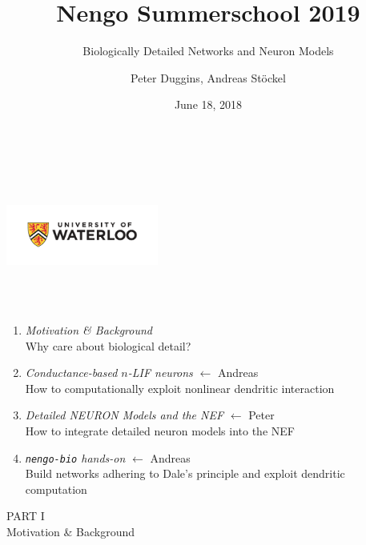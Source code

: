 \documentclass[aspectratio=169]{beamer}
\title{Nengo Summerschool 2019}
\subtitle{Biologically Detailed Networks and Neuron Models}
\author{Peter Duggins, Andreas Stöckel}
\date{June 18, 2018}
\renewcommand{\emph}[1]{{\color{violet}\textit{#1}}}
\begin{document}
 

\begin{frame}
	\centering\vspace{1cm}
	{\Large{\inserttitle}\\[0.25cm]}
	{\huge\color{violet}{\insertsubtitle}\\[0.75cm]}
	{\large{\insertauthor}\\[0.5cm]}
	\includegraphics[height=2cm]{media/uwlogo.pdf}
	\\[0.25cm]
	\insertdate
\end{frame}

\begin{frame}
	{\centering\Huge{}\\\color{aluminium3}\\}
	\large\vspace{-0.75cm}
	\begin{enumerate}
		\setlength{\itemsep}{0.5cm}
		\item<1-> \emph{Motivation \& Background}\\Why care about biological detail?
		\item<2-> \emph{Conductance-based $n$-LIF neurons} $\leftarrow$ Andreas\\How to computationally exploit nonlinear dendritic interaction
		\item<3-> \emph{Detailed NEURON Models and the NEF} $\leftarrow$ Peter\\How to integrate detailed neuron models into the NEF
		\item<4-> \emph{\texttt{nengo-bio} hands-on} $\leftarrow$ Andreas\\Build networks adhering to Dale's principle and exploit dendritic computation
	\end{enumerate}			
\end{frame}

\begin{frame}
\centering
\Large\textsc{PART I}\\[0.5cm]
{\huge\color{violet}Motivation \& Background}
\end{frame}
\end{document}
